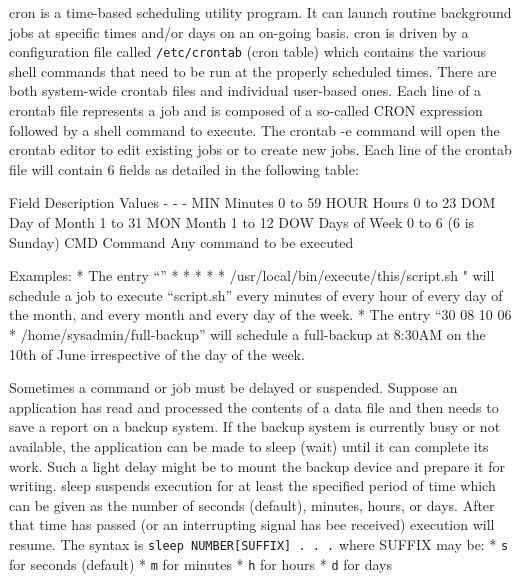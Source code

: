 \begin{Shaded}
\begin{Highlighting}[]
\NormalTok{$ } 
 
 \KeywordTok{<}\KeywordTok{>}             
 
\end{Highlighting}
\end{Shaded}

cron is a time-based scheduling utility program. It can launch routine
background jobs at specific times and/or days on an on-going basis. cron
is driven by a configuration file called \texttt{/etc/crontab} (cron
table) which contains the various shell commands that need to be run at
the properly scheduled times. There are both system-wide crontab files
and individual user-based ones. Each line of a crontab file represents a
job and is composed of a so-called CRON expression followed by a shell
command to execute. The crontab -e command will open the crontab editor
to edit existing jobs or to create new jobs. Each line of the crontab
file will contain 6 fields as detailed in the following table:

Field \textbar{} Description \textbar{} Values - \textbar{} - \textbar{}
- MIN \textbar{} Minutes \textbar{} 0 to 59 HOUR \textbar{} Hours
\textbar{} 0 to 23 DOM \textbar{} Day of Month \textbar{} 1 to 31 MON
\textbar{} Month \textbar{} 1 to 12 DOW \textbar{} Days of Week
\textbar{} 0 to 6 (6 is Sunday) CMD \textbar{} Command \textbar{} Any
command to be executed

Examples: * The entry ``'' * * * * *
/usr/local/bin/execute/this/script.sh " will schedule a job to execute
``script.sh'' every minutes of every hour of every day of the month, and
every month and every day of the week. * The entry ``30 08 10 06 *
/home/sysadmin/full-backup'' will schedule a full-backup at 8:30AM on
the 10th of June irrespective of the day of the week.

Sometimes a command or job must be delayed or suspended. Suppose an
application has read and processed the contents of a data file and then
needs to save a report on a backup system. If the backup system is
currently busy or not available, the application can be made to sleep
(wait) until it can complete its work. Such a light delay might be to
mount the backup device and prepare it for writing. sleep suspends
execution for at least the specified period of time which can be given
as the number of seconds (default), minutes, hours, or days. After that
time has passed (or an interrupting signal has bee received) execution
will resume. The syntax is \texttt{sleep NUMBER{[}SUFFIX{]} . . .} where
SUFFIX may be: * \texttt{s} for seconds (default) * \texttt{m} for
minutes * \texttt{h} for hours * \texttt{d} for days

